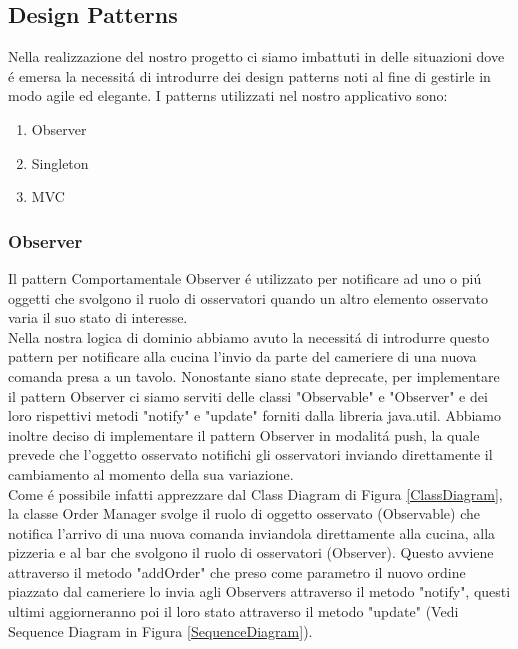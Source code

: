 \documentclass{article}
\begin{document}

\subsection{Design Patterns}
Nella realizzazione del nostro progetto ci siamo imbattuti in delle situazioni dove \'e emersa la necessit\'a di introdurre dei design patterns noti al fine di gestirle in modo agile ed elegante. I patterns utilizzati nel nostro applicativo sono: 

\begin{enumerate}
\item Observer
\item Singleton
\item MVC
\end{enumerate}

\subsubsection{Observer}

Il pattern Comportamentale Observer \'e utilizzato per notificare ad uno o pi\'u oggetti che svolgono il ruolo di osservatori quando un altro elemento osservato varia il suo stato di interesse. \\
Nella nostra logica di dominio abbiamo avuto la necessit\'a di introdurre questo pattern per notificare alla cucina l'invio da parte del cameriere di una nuova comanda presa a un tavolo. Nonostante siano state deprecate, per implementare il pattern Observer ci siamo serviti delle classi "Observable" e "Observer" e dei loro rispettivi metodi "notify" e "update" forniti dalla libreria java.util. Abbiamo inoltre deciso di implementare il pattern Observer in modalit\'a push, la quale prevede che l'oggetto osservato notifichi gli osservatori inviando direttamente il cambiamento al momento della sua variazione. \\ Come \'e possibile infatti apprezzare dal Class Diagram di Figura \ref{ClassDiagram}, la classe Order Manager svolge il ruolo di oggetto osservato (Observable) che notifica l'arrivo di una nuova comanda inviandola direttamente alla cucina, alla pizzeria e al bar che svolgono il ruolo di osservatori (Observer). Questo avviene attraverso il metodo "addOrder" che preso come parametro il nuovo ordine piazzato dal cameriere lo invia agli Observers attraverso il metodo "notify", questi ultimi aggiorneranno poi il loro stato attraverso il metodo "update" (Vedi Sequence Diagram in Figura \ref{SequenceDiagram}).
\end{document}
